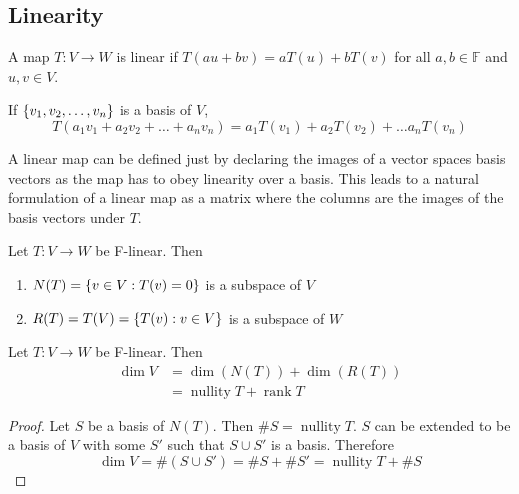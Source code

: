 \documentclass[../notes.tex]{subfiles}
\begin{document}

\subsection{Linearity}

\begin{definition}
	A map $T : V \to W$ is linear if $T(au + bv) = aT(u) + bT(v)$ for all $a,b \in \mathbb{F}$ and $u,v \in V$.
\end{definition}

\begin{theorem}
	If $\qty{v_1, v_2, \ldots, v_n}$ is a basis of $V$,
	\[
		T(a_1 v_1 + a_2 v_2 + \ldots + a_n v_n) = a_1 T(v_1) + a_2 T(v_2) + \ldots a_n T(v_n)
	\]
\end{theorem}

A linear map can be defined just by declaring the images of a vector spaces basis vectors as the map has to obey linearity over a basis. This leads to a natural formulation of a linear map as a matrix where the columns are the images of the basis vectors under $T$.

\begin{definition}
    Let $T : V \to W$ be F-linear. Then
    \begin{enumerate}
        \item $N(T) = \qty{v \in V : T(v) = 0}$ is a subspace of $V$
        \item $R(T) = T(V) = \qty{T(v) : v \in V}$ is a subspace of $W$
    \end{enumerate}
\end{definition}

\begin{theorem}
    Let $T : V \to W$ be F-linear. Then
    \begin{align*}
        \dim V &= \dim(N(T)) + \dim(R(T)) \\
               &= \operatorname{nullity} T + \operatorname{rank} T
    \end{align*}
\end{theorem}

\begin{proof}
    Let $S$ be a basis of $N(T)$. Then $\#S = \operatorname{nullity} T$. $S$ can be extended to be a basis of $V$ with some $S'$ such that $S \cup S'$ is a basis. Therefore
    \[
        \dim V = \#(S \cup S') = \#S + \#S' = \operatorname{nullity} T + \#S
    \]

\end{proof}
\end{document}

